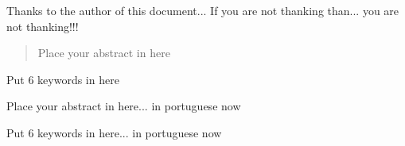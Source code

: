 \documentclass[defaultstyle,10pt,master,Helvetica]{thesis}
\begin{document}
\setcounter{page}{1} 

\baselineskip 18pt %

\begin{acknowledgments}
Thanks to the author of this document... If you are not thanking than... you are not thanking!!!
\end{acknowledgments}

\begin{abstract}
Place your abstract in here
\end{abstract}

\begin{keywords}
Put 6 keywords in here
\end{keywords}
\clearpage
\thispagestyle{empty}
\cleardoublepage

\begin{resumo}
Place your abstract in here... in portuguese now
\end{resumo}

\begin{palavraschave}
Put 6 keywords in here... in portuguese now
\end{palavraschave}

\clearpage
\thispagestyle{empty}
\cleardoublepage

\dominitoc
\dominilof
\dominilot

\tableofcontents
\cleardoublepage

\listoffigures
\cleardoublepage

\listoftables
\cleardoublepage

\end{document}

